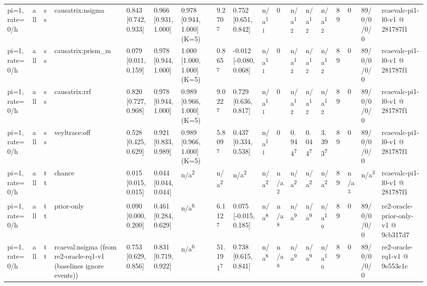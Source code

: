 \begin{table}[t]
\begin{tabular}{llllllllllllllllll}
pi=1, rate=0/h & all & ss & causatrix:nsigma & 0.843 [0.742, 0.933] & 0.966 [0.931, 1.000] & 0.978 [0.944, 1.000] (K=5) & 9.270\textsuperscript{7} & 0.752 [0.651, 0.842] & n/a\textsuperscript{11} & 0 & n/a\textsuperscript{12} & n/a\textsuperscript{12} & n/a\textsuperscript{12} & 89 & 0 & 89/0/0/0/0 & rcaevalc-pi1-l0-v1 @ 281787f1 \\
pi=1, rate=0/h & all & ss & causatrix:prism\_m & 0.079 [0.011, 0.159] & 0.978 [0.944, 1.000] & 1.000 [1.000, 1.000] (K=5) & 0.865\textsuperscript{7} & -0.012 [-0.080, 0.068] & n/a\textsuperscript{11} & 0 & n/a\textsuperscript{12} & n/a\textsuperscript{12} & n/a\textsuperscript{12} & 89 & 0 & 89/0/0/0/0 & rcaevalc-pi1-l0-v1 @ 281787f1 \\
pi=1, rate=0/h & all & ss & causatrix:rrf & 0.820 [0.727, 0.908] & 0.978 [0.944, 1.000] & 0.989 [0.966, 1.000] (K=5) & 9.022\textsuperscript{7} & 0.729 [0.636, 0.817] & n/a\textsuperscript{11} & 0 & n/a\textsuperscript{12} & n/a\textsuperscript{12} & n/a\textsuperscript{12} & 89 & 0 & 89/0/0/0/0 & rcaevalc-pi1-l0-v1 @ 281787f1 \\
pi=1, rate=0/h & all & ss & veyltrace:off & 0.528 [0.425, 0.629] & 0.921 [0.833, 0.989] & 0.989 [0.966, 1.000] (K=5) & 5.809\textsuperscript{7} & 0.437 [0.334, 0.538] & n/a\textsuperscript{11} & 0 & 0.944\textsuperscript{7} & 0.044\textsuperscript{7} & 3.393\textsuperscript{7} & 89 & 0 & 89/0/0/0/0 & rcaevalc-pi1-l0-v1 @ 281787f1 \\
pi=1, rate=0/h & all & tt & chance & 0.015 [0.015, 0.015] & 0.044 [0.044, 0.044] & n/a\textsuperscript{2} & n/a\textsuperscript{2} & n/a\textsuperscript{2} & n/a\textsuperscript{2} & n/a\textsuperscript{2} & n/a\textsuperscript{2} & n/a\textsuperscript{2} & n/a\textsuperscript{2} & 89 & n/a\textsuperscript{3} & n/a\textsuperscript{3} & rcaevalc-pi1-l0-v1 @ 281787f1 \\
pi=1, rate=0/h & all & tt & prior-only & 0.090 [0.000, 0.200] & 0.461 [0.284, 0.629] & n/a\textsuperscript{6} & 6.112\textsuperscript{7} & 0.075 [-0.015, 0.185] & n/a\textsuperscript{8} & n/a\textsuperscript{8} & n/a\textsuperscript{9} & n/a\textsuperscript{9} & n/a\textsuperscript{10} & 89 & 0 & 89/0/0/0/0 & re2-oracle-prior-only-v1 @ 9cb317d7 \\
pi=1, rate=0/h & all & tt & rcaeval:nsigma (from re2-oracle-rq1-v1 (baselines ignore events)) & 0.753 [0.629, 0.856] & 0.831 [0.719, 0.922] & n/a\textsuperscript{6} & 51.191\textsuperscript{7} & 0.738 [0.615, 0.841] & n/a\textsuperscript{8} & n/a\textsuperscript{8} & n/a\textsuperscript{9} & n/a\textsuperscript{9} & n/a\textsuperscript{10} & 89 & 0 & 89/0/0/0/0 & re2-oracle-rq1-v1 @ 9e553e1c \\

\end{tabular}
\end{table}
